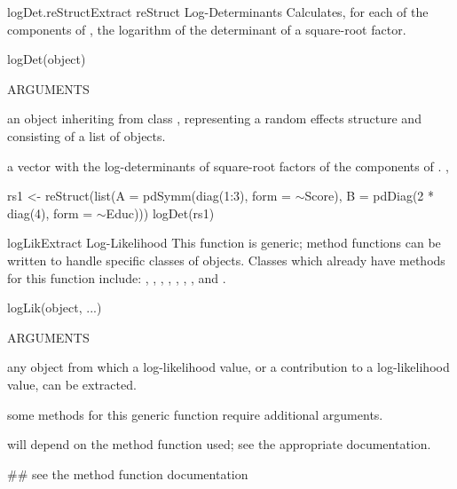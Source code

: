 \documentclass[pdftex]{article} \usepackage{url,graphicx}
\renewcommand{\Twiddle}{\mbox{\(\sim\)}}
\begin{document}
\begin{Helpfile}{logDet.reStruct}{Extract reStruct Log-Determinants}
Calculates, for each of the  components of ,
the logarithm of the determinant of a square-root factor.
\begin{Example}
logDet(object)
\end{Example}
\begin{Argument}{ARGUMENTS}
\item[\Co{object:}]
an object inheriting from class ,
representing a random effects structure and consisting of a list of
 objects.
\end{Argument}
a vector with the log-determinants of square-root factors of the
 components of .
, 
\need 15pt
\vspace{-16pt} 
\begin{Example}
rs1 <- reStruct(list(A = pdSymm(diag(1:3), form = \Twiddle Score),
  B = pdDiag(2 * diag(4), form = \Twiddle Educ)))
logDet(rs1)
\end{Example}
\end{Helpfile}
\begin{Helpfile}{logLik}{Extract Log-Likelihood}
This function is generic; method functions can be written to handle
specific classes of objects. Classes which already have methods for
this function include: , , ,
, , , , and
.
\begin{Example}
logLik(object, ...)
\end{Example}
\begin{Argument}{ARGUMENTS}
\item[\Co{object:}]
any object from which a log-likelihood value, or a
contribution to a log-likelihood value, can be extracted.
\item[\Co{...:}]
some methods for this generic function require additional
arguments.
\end{Argument}
will depend on the method function used; see the appropriate
documentation.
\need 15pt
\vspace{-16pt} 
\begin{Example}
## see the method function documentation
\end{Example}
\end{Helpfile}
\end{document}
